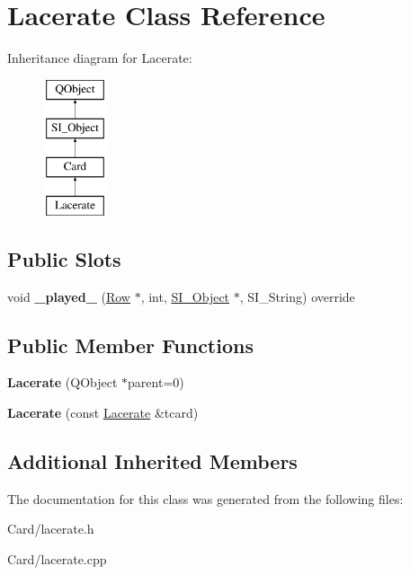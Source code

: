 \hypertarget{class_lacerate}{}\section{Lacerate Class Reference}
\label{class_lacerate}
Inheritance diagram for Lacerate\+:\begin{figure}[H]
\begin{center}
\leavevmode
\includegraphics[height=4.000000cm]{class_lacerate}
\end{center}
\end{figure}
\subsection*{Public Slots}
\begin{DoxyCompactItemize}
\item 
\mbox{\label{class_lacerate_a645830e028cb6c4098da5b17fc8f62f7}} 
void {\bfseries \+\_\+played\+\_\+} (\hyperlink{class_card_set}{Row} $\ast$, int, \hyperlink{class_s_i___object}{S\+I\+\_\+\+Object} $\ast$, S\+I\+\_\+\+String) override
\end{DoxyCompactItemize}
\subsection*{Public Member Functions}
\begin{DoxyCompactItemize}
\item 
\mbox{\label{class_lacerate_a9b28cd7e71ddc274f83541488b742db7}} 
{\bfseries Lacerate} (Q\+Object $\ast$parent=0)
\item 
\mbox{\label{class_lacerate_a57c023e6bdb27f1bfec90396951760ad}} 
{\bfseries Lacerate} (const \hyperlink{class_lacerate}{Lacerate} \&tcard)
\end{DoxyCompactItemize}
\subsection*{Additional Inherited Members}


The documentation for this class was generated from the following files\+:\begin{DoxyCompactItemize}
\item 
Card/lacerate.\+h\item 
Card/lacerate.\+cpp\end{DoxyCompactItemize}
